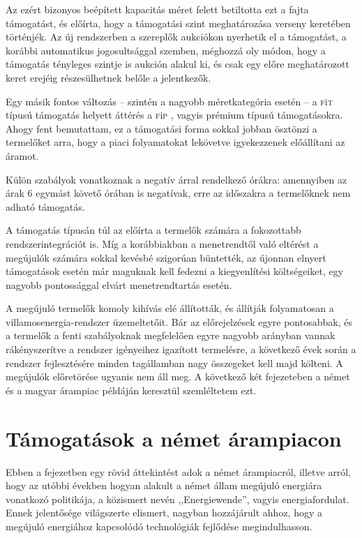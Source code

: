\documentclass[twoside, magyar, showtrims]{corvinusphd}
\newcommand{\fit}{\textsc{f}i\textsc{t}\index{\textsc{f}i\textsc{t}} }
\newcommand{\fip}{\textsc{f}i\textsc{p}\index{\textsc{f}i\textsc{p}} }
\begin{document}
Az  ezért bizonyos beépített kapacitás
méret felett betiltotta ezt a fajta támogatást,
és előírta, hogy a támogatási szint
meghatározása verseny keretében történjék.
Az új rendszerben a szereplők aukciókon nyerhetik
el a támogatást, a korábbi automatikus jogosultsággal
szemben, méghozzá oly módon, hogy a támogatás
tényleges szintje is aukción alakul ki, 
és csak egy előre meghatározott keret erejéig
részesülhetnek belőle a jelentkezők.

Egy másik fontos változás -- szintén a nagyobb
méretkategória esetén -- a \fit típusú támogatás
helyett áttérés a \fip, vagyis prémium
típusú támogatásokra. Ahogy fent bemutattam,
ez a támogatási forma sokkal jobban ösztönzi a
termelőket arra, hogy a piaci folyamatokat
lekövetve igyekezzenek előállítani az áramot.

Külön szabályok vonatkoznak a negatív árral
rendelkező órákra: amennyiben az árak 6 egymást
követő órában is negatívak, erre az időszakra
a termelőknek nem adható támogatás. 

A támogatás típusán túl az 
előírta a termelők számára a fokozottabb
rendszerintegrációt is. Míg a korábbiakban
a menetrendtől való eltérést a megújulók számára
sokkal kevésbé szigorúan büntették,
az újonnan elnyert támogatások esetén már
maguknak kell fedezni a kiegyenlítési költségeiket,
egy nagyobb pontossággal elvárt menetrendtartás esetén.

A megújuló termelők komoly kihívás elé állították, 
és állítják folyamatosan a villamosenergia-rendszer üzemeltetőit.
Bár az előrejelzések egyre pontosabbak, és a termelők a fenti szabályoknak
megfelelően egyre nagyobb arányban vannak rákényszerítve
a rendszer igényeihez igazított termelésre, a következő évek során
a rendszer fejlesztésére minden tagállamban nagy összegeket kell majd költeni.
A megújulók előretörése ugyanis nem áll meg. A következő
két fejezeteben a német és a magyar árampiac példáján
keresztül szemléltetem ezt.

\section{Támogatások a német árampiacon}

Ebben a fejezetben egy rövid áttekintést adok
a német árampiacról, illetve arról, hogy az utóbbi 
években hogyan alakult a német állam megújuló
energiára vonatkozó politikája,
a közismert nevén ,,Energiewende'', vagyis energiafordulat.
Ennek jelentősége világszerte elismert, nagyban
hozzájárult ahhoz, hogy a megújuló energiához
kapcsolódó technológiák fejlődése megindulhasson.
\end{document}
